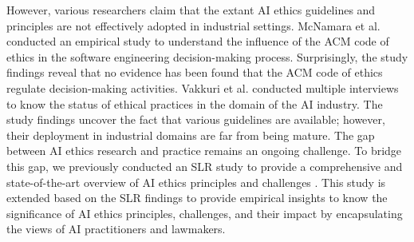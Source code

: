 However, various researchers claim that the extant AI ethics guidelines and principles are not effectively adopted in industrial settings. McNamara et al. \cite{AR9} conducted an empirical study to understand the influence of the ACM code of ethics in the software engineering decision-making process. Surprisingly, the study findings reveal that no evidence has been found that the ACM code of ethics regulate decision-making activities. Vakkuri et al. \cite{AR10} conducted multiple interviews to know the status of ethical practices in the domain of the AI industry. The study findings uncover the fact that various guidelines are available; however, their deployment in industrial domains are far from being mature. The gap between AI ethics research and practice remains an ongoing challenge. To bridge this gap, we previously conducted an SLR study to provide a comprehensive and state-of-the-art overview of AI ethics principles and challenges \cite{AR13}. This study is extended based on the SLR findings \cite{AR13} to provide empirical insights to know the significance of AI ethics principles, challenges, and their impact by encapsulating the views of AI practitioners and lawmakers.